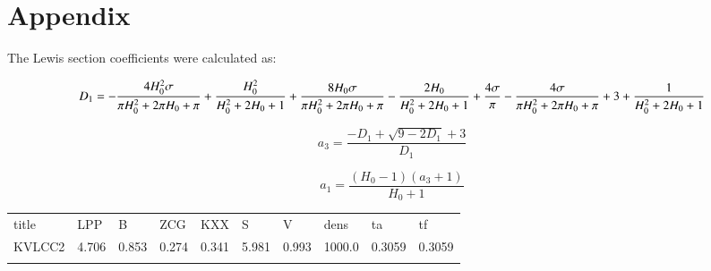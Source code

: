 \section{Appendix}\label{appendix}

    The Lewis section coefficients were calculated as:
 
            
    
    \begin{equation}
D_{1} = - \frac{4 H_{0}^{2} \sigma}{\pi H_{0}^{2} \\ + 2 \pi H_{0} \\ + \pi} \\ + \frac{H_{0}^{2}}{H_{0}^{2} \\ + 2 H_{0} \\ + 1} \\ + \frac{8 H_{0} \sigma}{\pi H_{0}^{2} \\ + 2 \pi H_{0} \\ + \pi} - \frac{2 H_{0}}{H_{0}^{2} \\ + 2 H_{0} \\ + 1} \\ + \frac{4 \sigma}{\pi} - \frac{4 \sigma}{\pi H_{0}^{2} \\ + 2 \pi H_{0} \\ + \pi} \\ + 3 \\ + \frac{1}{H_{0}^{2} \\ + 2 H_{0} \\ + 1}
\label{eq:equation}
\end{equation}

    
 
            
    
    \begin{equation}
a_{3} = \frac{- D_{1} + \sqrt{9 - 2 D_{1}} + 3}{D_{1}}
\label{eq:equation}
\end{equation}

    
 
            
    
    \begin{equation}
a_{1} = \frac{\left(H_{0} - 1\right) \left(a_{3} + 1\right)}{H_{0} + 1}
\label{eq:equation}
\end{equation}

    
 
            
    
    \begin{longtable}[c]{@{}llllllllll@{}}
\toprule\addlinespace
title & LPP & B & ZCG & KXX & S & V & dens & ta & tf\\\addlinespace 
\midrule\endhead
KVLCC2 & 4.706 & 0.853 & 0.274 & 0.341 & 5.981 & 0.993 & 1000.0 & 0.3059 & 0.3059\\\addlinespace 
\bottomrule 
 \end{longtable}

